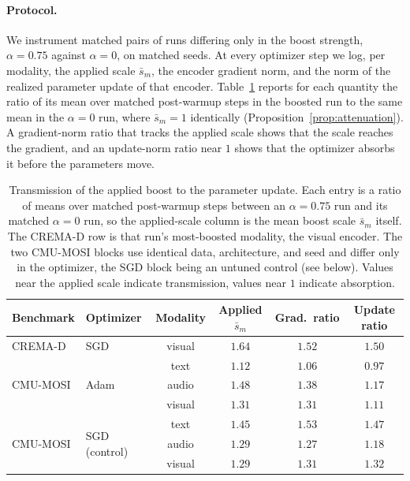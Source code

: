 \documentclass{article}
\begin{document}
\paragraph{Protocol.} We instrument matched pairs of runs differing only in the boost strength, $\alpha = 0.75$ against $\alpha = 0$, on matched seeds. At every optimizer step we log, per modality, the applied scale $\bar{s}_m$, the encoder gradient norm, and the norm of the realized parameter update of that encoder. Table~\ref{tab:optimizer_transmission} reports for each quantity the ratio of its mean over matched post-warmup steps in the boosted run to the same mean in the $\alpha = 0$ run, where $\bar{s}_m = 1$ identically (Proposition~\ref{prop:attenuation}). A gradient-norm ratio that tracks the applied scale shows that the scale reaches the gradient, and an update-norm ratio near $1$ shows that the optimizer absorbs it before the parameters move.

\begin{table}[H]
\centering
\caption{Transmission of the applied boost to the parameter update. Each entry is a ratio of means over matched post-warmup steps between an $\alpha = 0.75$ run and its matched $\alpha = 0$ run, so the applied-scale column is the mean boost scale $\bar{s}_m$ itself. The CREMA-D row is that run's most-boosted modality, the visual encoder. The two CMU-MOSI blocks use identical data, architecture, and seed and differ only in the optimizer, the SGD block being an untuned control (see below). Values near the applied scale indicate transmission, values near $1$ indicate absorption.}
\label{tab:optimizer_transmission}
\begin{tabular}{llcccc}
\toprule
\textbf{Benchmark} & \textbf{Optimizer} & \textbf{Modality} & \textbf{Applied $\bar{s}_m$} & \textbf{Grad.\ ratio} & \textbf{Update ratio} \\
\midrule
CREMA-D & SGD & visual & $1.64$ & $1.52$ & $1.50$ \\
\midrule
\multirow{3}{*}{CMU-MOSI} & \multirow{3}{*}{Adam} & text   & $1.12$ & $1.06$ & $0.97$ \\
                          &                       & audio  & $1.48$ & $1.38$ & $1.17$ \\
                          &                       & visual & $1.31$ & $1.31$ & $1.11$ \\
\midrule
\multirow{3}{*}{CMU-MOSI} & \multirow{3}{*}{SGD (control)} & text   & $1.45$ & $1.53$ & $1.47$ \\
                          &                                & audio  & $1.29$ & $1.27$ & $1.18$ \\
                          &                                & visual & $1.29$ & $1.31$ & $1.32$ \\
\bottomrule
\end{tabular}
\end{table}
\end{document}
